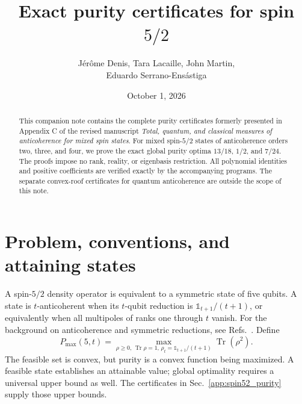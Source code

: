 \documentclass[11pt]{article}
\title{Exact purity certificates for spin $5/2$}
\author{J\'er\^ome Denis, Tara Lacaille, John Martin,\\Eduardo Serrano-Ens\'astiga}
\date{October 1, 2026}
\DeclareMathOperator{\Tr}{Tr}
\newcommand{\id}{\mathds{1}}
\begin{document}
\maketitle
\begin{abstract}
This companion note contains the complete purity certificates formerly presented in Appendix C of the revised manuscript \emph{Total, quantum, and classical measures of anticoherence for mixed spin states}. For mixed spin-$5/2$ states of anticoherence orders two, three, and four, we prove the exact global purity optima $13/18$, $1/2$, and $7/24$. The proofs impose no rank, reality, or eigenbasis restriction. All polynomial identities and positive coefficients are verified exactly by the accompanying programs. The separate convex-roof certificates for quantum anticoherence are outside the scope of this note.
\end{abstract}

\section{Problem, conventions, and attaining states}
A spin-$5/2$ density operator is equivalent to a symmetric state of five qubits. A state is $t$-anticoherent when its $t$-qubit reduction is $\id_{t+1}/(t+1)$, or equivalently when all multipoles of ranks one through $t$ vanish. For the background on anticoherence and symmetric reductions, see Refs.~\cite{Denis2026,BaguetteMartin2017}. Define
\begin{equation}
 P_{\max}(5,t)=\max_{\rho\ge0,\,\Tr\rho=1,\,\rho_t=\id_{t+1}/(t+1)}\Tr(\rho^2).
\end{equation}
The feasible set is convex, but purity is a convex function being maximized. A feasible state establishes an attainable value; global optimality requires a universal upper bound as well. The certificates in Sec.~\ref{app:spin52_purity} supply those upper bounds.
\end{document}
